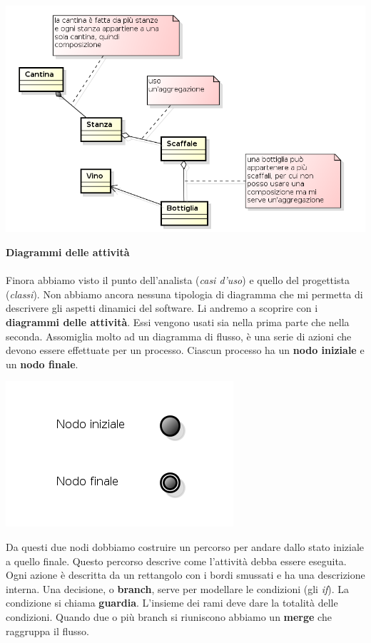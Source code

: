 \begin{center}

\includegraphics[width=0.75\columnwidth]{img3} %

\end{center}

\textbf{Diagrammi delle attività}\\\\

Finora abbiamo visto il punto dell'analista (\textit{casi d'uso}) e quello del progettista (\textit{classi}). Non abbiamo ancora nessuna tipologia di diagramma che mi permetta di descrivere gli aspetti dinamici del software. Li andremo a scoprire con i \textbf{diagrammi delle attività}. Essi vengono usati sia nella prima parte che nella seconda. Assomiglia molto ad un diagramma di flusso, è una serie di azioni che devono essere effettuate per un processo. Ciascun processo ha un \textbf{nodo iniziale} e un \textbf{nodo finale}.

\begin{center}

\includegraphics[width=0.75\columnwidth]{img4} %

\end{center}

Da questi due nodi dobbiamo costruire un percorso per andare dallo stato iniziale a quello finale. Questo percorso descrive come l'attività debba essere eseguita. Ogni azione è descritta da un rettangolo con i bordi smussati e ha una descrizione interna. Una decisione, o \textbf{branch}, serve per modellare le condizioni (gli \textit{if}). La condizione si chiama \textbf{guardia}. L'insieme dei rami deve dare la totalità delle condizioni. Quando due o più branch si riuniscono abbiamo un \textbf{merge} che raggruppa il flusso.


